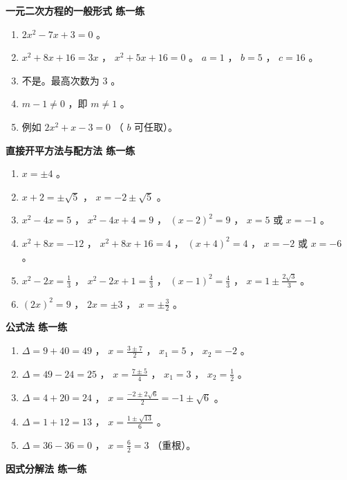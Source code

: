 \begin{answer}


\textbf{一元二次方程的一般形式 练一练}

\begin{enumerate}
  \item $2x^2 - 7x + 3 = 0$ 。
  \item $x^2 + 8x + 16 = 3x$ ， $x^2 + 5x + 16 = 0$ 。 $a = 1$ ， $b = 5$ ， $c = 16$ 。
  \item 不是。最高次数为 $3$ 。
  \item $m - 1 \neq 0$ ，即 $m \neq 1$ 。
  \item 例如 $2x^2 + x - 3 = 0$ （ $b$ 可任取）。
\end{enumerate}


\textbf{直接开平方法与配方法 练一练}

\begin{enumerate}
  \item $x = \pm 4$ 。
  \item $x + 2 = \pm\sqrt{5}$ ， $x = -2 \pm \sqrt{5}$ 。
  \item $x^2 - 4x = 5$ ， $x^2 - 4x + 4 = 9$ ， $(x-2)^2 = 9$ ， $x = 5$ 或 $x = -1$ 。
  \item $x^2 + 8x = -12$ ， $x^2 + 8x + 16 = 4$ ， $(x+4)^2 = 4$ ， $x = -2$ 或 $x = -6$ 。
  \item $x^2 - 2x = \frac{1}{3}$ ， $x^2 - 2x + 1 = \frac{4}{3}$ ， $(x-1)^2 = \frac{4}{3}$ ， $x = 1 \pm \frac{2\sqrt{3}}{3}$ 。
  \item $(2x)^2 = 9$ ， $2x = \pm 3$ ， $x = \pm\frac{3}{2}$ 。
\end{enumerate}


\textbf{公式法 练一练}

\begin{enumerate}
  \item $\Delta = 9 + 40 = 49$ ， $x = \frac{3 \pm 7}{2}$ ， $x_1 = 5$ ， $x_2 = -2$ 。
  \item $\Delta = 49 - 24 = 25$ ， $x = \frac{7 \pm 5}{4}$ ， $x_1 = 3$ ， $x_2 = \frac{1}{2}$ 。
  \item $\Delta = 4 + 20 = 24$ ， $x = \frac{-2 \pm 2\sqrt{6}}{2} = -1 \pm \sqrt{6}$ 。
  \item $\Delta = 1 + 12 = 13$ ， $x = \frac{1 \pm \sqrt{13}}{6}$ 。
  \item $\Delta = 36 - 36 = 0$ ， $x = \frac{6}{2} = 3$ （重根）。
\end{enumerate}


\textbf{因式分解法 练一练}


\end{answer}
